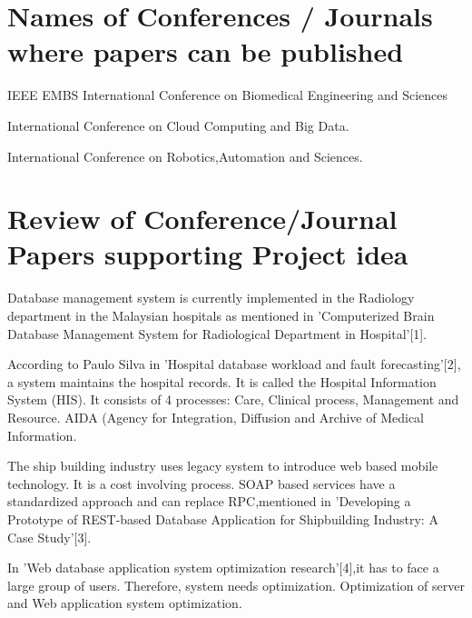 \documentclass[oneside,a4paper,12pt]{book}
\begin{document}
\newpage
\section{Names of Conferences / Journals where papers can be published}
\begin{enumerate}[{[1]}]
\item IEEE EMBS International Conference on Biomedical Engineering and Sciences
\item International Conference on Cloud Computing and Big Data.
\item International Conference on Robotics,Automation and Sciences.

\end{enumerate}





\section{Review of Conference/Journal Papers supporting Project idea}
\label{sec:survey}
\begin{enumerate}[{[1]}]
\item Database management system is currently implemented in the Radiology department in the Malaysian hospitals as mentioned in 'Computerized Brain Database Management System for Radiological Department in Hospital'[1].


\item According to Paulo Silva in 'Hospital database workload and fault forecasting'[2], a system maintains the hospital records. It is called the Hospital Information System (HIS). It consists of 4 processes: Care, Clinical process, Management and Resource. AIDA (Agency for Integration, Diffusion and Archive of Medical Information.

\item The ship building industry uses legacy system to introduce web based mobile technology. It is a cost involving process. SOAP based services have a standardized approach and can replace RPC,mentioned in 'Developing a Prototype of REST-based Database Application for Shipbuilding Industry: A Case Study'[3].



\item In 'Web database application system optimization research'[4],it has to face a large group of users. Therefore, system needs optimization. Optimization of server and Web application system optimization.
\end{enumerate}
\end{document}
